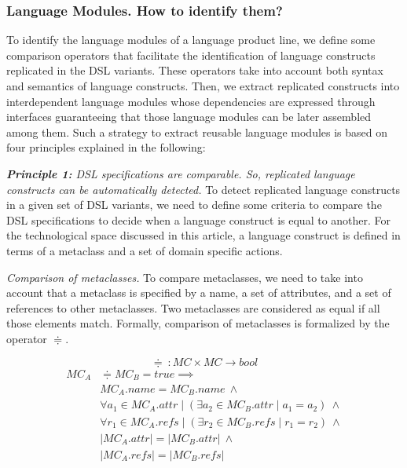 \subsubsection{Language Modules. \textbf{How to identify them?}}

To identify the language modules of a language product line, we define some comparison operators that facilitate the identification of language constructs replicated in the DSL variants. These operators take into account both syntax and semantics of language constructs. Then, we extract replicated constructs into interdependent language modules whose dependencies are expressed through interfaces guaranteeing that those language modules can be later assembled among them. Such a strategy to extract reusable language modules is based on four principles explained in the following:

\vspace{1mm}
\emph{\textbf{Principle 1:} DSL specifications are comparable. So, replicated language constructs can be automatically detected.} To detect replicated language constructs in a given set of DSL variants, we need to define some criteria to compare the DSL specifications to decide when a language construct is equal to another. For the technological space discussed in this article, a language construct is defined in terms of a metaclass and a set of domain specific actions. 

\vspace{1mm}
\emph{Comparison of metaclasses.} To compare metaclasses, we need to take into account that a metaclass is specified by a name, a set of attributes, and a set of references to other metaclasses. Two metaclasses are considered as equal if all those elements match. Formally, comparison of metaclasses is formalized by the operator $\doteqdot$.

\begin{equation}
  \doteqdot~: MC \times MC \rightarrow bool
\end{equation}
\begin{equation}
\begin{split}
  MC_{A} &\doteqdot MC_{B} = true \implies \\
   & MC_{A}.name = MC_{B}.name ~ \wedge \\
   & \forall a_1 \in MC_{A}.attr \mid (\exists a_2 \in MC_{B}.attr \mid a_1 = a_2) ~ \wedge \\
   & \forall r_1 \in MC_{A}.refs \mid (\exists r_2 \in MC_{B}.refs \mid r_1 = r_2) ~ \wedge \\
   & |MC_{A}.attr| = |MC_{B}.attr| ~ \wedge \\
   & |MC_{A}.refs| = |MC_{B}.refs|
  \end{split}
\end{equation}

